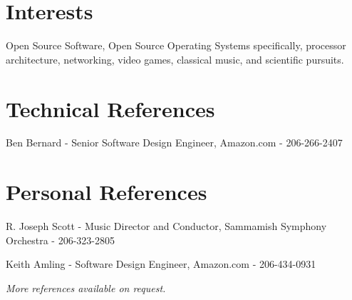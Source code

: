 \documentclass[margin,line]{resume}
\begin{document}
\begin{resume}
    \section{\mysidestyle Interests} 
    Open Source Software, Open Source Operating Systems specifically, processor
    architecture, networking, video games, classical music, and scientific
    pursuits.

    \section{\mysidestyle Technical References}
    \begin{list2}
        \item
        Ben Bernard - Senior Software Design Engineer, Amazon.com - 206-266-2407
    \end{list2}

    \vspace{2mm}

    \section{\mysidestyle Personal References}
    \begin{list2}
        \item
        R. Joseph Scott - Music Director and Conductor, Sammamish Symphony
        Orchestra - 206-323-2805
        \item
        Keith Amling - Software Design Engineer, Amazon.com - 206-434-0931
    \end{list2}

    {\sl More references available on request.}


\end{resume}
\end{document}
